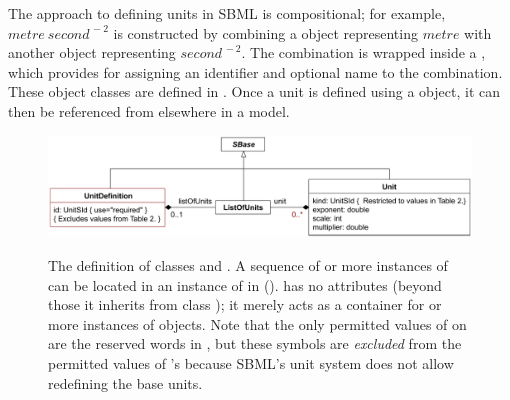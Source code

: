 The approach to defining units in SBML is compositional; for
example, $metre\ second^{\,-2}$ is constructed by combining a
\Unit object representing $metre$ with another \Unit object
representing $second^{\,-2}$.  The combination is wrapped inside a
\UnitDefinition, which provides for assigning an identifier and
optional name to the combination.  These object classes are
defined in .  Once a unit is
defined using a \UnitDefinition object, it can then be referenced
from elsewhere in a model.

\begin{figure}[htb]
  \centering
  \vspace*{1.5ex}
             {\includegraphics[scale=0.78]{figs/unitdefinition-uml}}
  \vspace*{0.5ex}
  \caption{The definition of classes \UnitDefinition and
      \Unit.  A sequence of  or more instances of
      \UnitDefinition can be located in an instance of
      \ListOfUnitDefinitions in \Model
      (\protect{}).  \ListOfUnits has
      no attributes (beyond those it inherits from class \SBaseUpright);
      it merely acts as a container for  or more instances of
      \Unit objects.  Note that the only permitted values of
       on \Unit are the reserved words in
      , but these symbols are
      \emph{excluded} from the permitted values of
      \UnitDefinition's  because SBML's unit system does
      not allow redefining the base units.}
  \label{fig:unitdefinition}
\end{figure}



